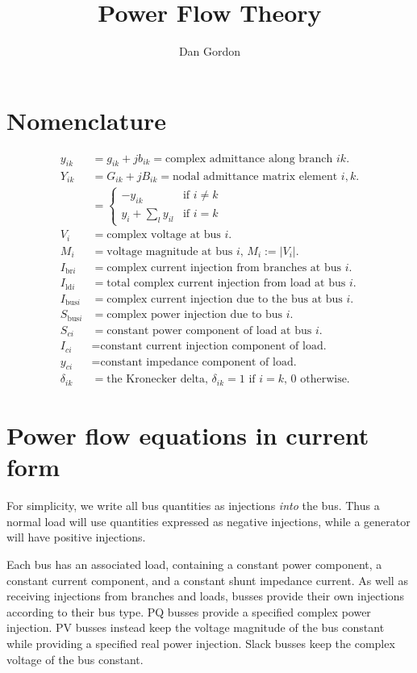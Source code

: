 \documentclass[11pt]{article}
\title{Power Flow Theory}
\author{Dan Gordon}
\date{}
\begin{document}
\maketitle

\section{Nomenclature}
\begin{align*}
y_{ik} &= g_{ik} + jb_{ik} = \text{complex admittance along branch $ik$.} \\
Y_{ik} &= G_{ik} + jB_{ik} = \text{nodal admittance matrix element $i, k$.} \\
&= 
	\begin{cases}
		-y_{ik}&\text{if $i \ne k$} \\
		y_i + \sum_l y_{il}& \text{if $i = k$}
	\end{cases} \\
V_i &= \text{complex voltage at bus $i$.} \\
M_i &= \text{voltage magnitude at bus $i$, $M_i := |V_i|$.} \\
I_{\text{br}i} &= \text{complex current injection from branches at bus $i$.} \\
I_{\text{ld}i} &= \text{total complex current injection from load at bus $i$.} \\
I_{\text{bus}i} &= \text{complex current injection due to the bus at bus $i$.} \\
S_{\text{bus}i} &= \text{complex power injection due to bus $i$.} \\
S_{ci} &= \text{constant power component of load at bus $i$.} \\
I_{ci} &= \text{constant current injection component of load.} \\
y_{ci} &= \text{constant impedance component of load.} \\
\delta_{ik} &= \text{the Kronecker delta, $\delta_{ik} = 1$ if $i = k$, 0 otherwise.}
\end{align*}

\section{Power flow equations in current form}
For simplicity, we write all bus quantities as injections \emph{into} the bus. Thus a normal load will use quantities expressed as negative injections, while a generator will have positive injections.

Each bus has an associated load, containing a constant power component, a constant current component, and a constant shunt impedance current. As well as receiving injections from branches and loads, busses provide their own injections according to their bus type. PQ busses provide a specified complex power injection. PV busses instead keep the voltage magnitude of the bus constant while providing a specified real power injection. Slack busses keep the complex voltage of the bus constant.
\end{document}
